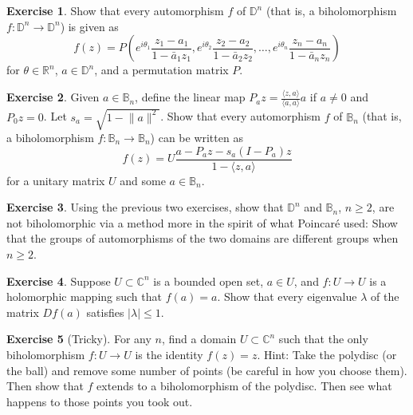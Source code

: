 \documentclass[12pt,openany]{book}
\newcommand{\linnprod}[2]{\langle #1 , #2 \rangle}
\newcommand{\sabs}[1]{\lvert {#1} \rvert}
\newcommand{\snorm}[1]{\lVert {#1} \rVert}
\newcommand{\C}{{\mathbb{C}}}
\newcommand{\R}{{\mathbb{R}}}
\newcommand{\D}{{\mathbb{D}}}
\newcommand{\bB}{{\mathbb{B}}}
\theoremstyle{plain}
\theoremstyle{remark}
\theoremstyle{definition}
\newenvironment{exbox}{%
    \def\FrameCommand{\vrule width 1pt \relax\hspace{10pt}}%
    \MakeFramed{\advance\hsize-\width\FrameRestore}%
}{%
    \endMakeFramed
}
\theoremstyle{exercise}
\newtheorem{exercise}{Exercise}[section]
\theoremstyle{example}
\begin{document}
\begin{exbox}
\begin{exercise} \label{exercise:autofpolydisc}
Show that every automorphism $f$ of $\D^n$ (that is, a biholomorphism $f \colon \D^n \to \D^n$)
is given as
\begin{equation*}
f(z) = P \left(
e^{i\theta_1} \frac{z_1-a_1}{1-\bar{a}_1z_1} ,
e^{i\theta_2} \frac{z_2-a_2}{1-\bar{a}_2z_2} , \ldots,
e^{i\theta_n} \frac{z_n-a_n}{1-\bar{a}_nz_n} \right)
\end{equation*}
for $\theta \in \R^n$, $a \in \D^n$, and
a permutation matrix $P$.
\end{exercise}

\begin{exercise}
Given $a \in \bB_n$, define the linear map $P_a z =
\frac{\linnprod{z}{a}}{\linnprod{a}{a}}a$ if $a \neq 0$ and $P_0z = 0$.
Let $s_a = \sqrt{1-\snorm{a}^2}$.  Show that every automorphism $f$ of
$\bB_n$ (that is, a biholomorphism $f \colon \bB_n \to \bB_n$)
can be written as
\begin{equation*}
f(z) = U \frac{a-P_az-s_a(I-P_a)z}{1-\linnprod{z}{a}}
\end{equation*}
for a unitary matrix $U$ and some $a \in \bB_n$.
\end{exercise}

\begin{exercise}
Using the previous two exercises, show that $\D^n$ and $\bB_n$, $n \geq 2$,
are not biholomorphic via a method more in the spirit of what Poincar\'e
used: Show that the groups of automorphisms of the two domains are
different groups when $n \geq 2$.
\end{exercise}

\begin{exercise} \label{exercise:boundedeigen}
Suppose $U \subset \C^n$ is a bounded open set, $a \in U$, and $f \colon U \to U$ is a
holomorphic mapping such that $f(a) = a$.  Show that every eigenvalue
$\lambda$ of the matrix $Df(a)$ satisfies $\sabs{\lambda} \leq 1$.
\end{exercise}

\begin{exercise}[Tricky]
For any $n$, find a domain $U \subset \C^n$ such that the only biholomorphism $f \colon U
\to U$ is the identity $f(z) = z$.  Hint: Take the polydisc (or the ball)
and remove some number of points (be careful in how you choose them).  Then
show that $f$ extends to a biholomorphism of the polydisc.  Then see what
happens to those points you took out.
\end{exercise}


\end{exbox}
\end{document}

